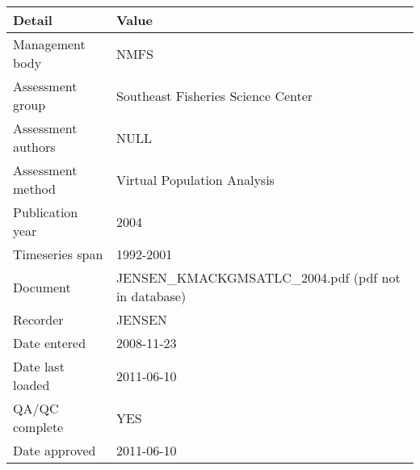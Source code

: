 \begin{table}[htb]
\centering
\begin{tabular}{lp{7cm}}
\toprule
Detail & Value \\
\midrule
Management body    & NMFS                                                 \\
Assessment group   & Southeast Fisheries Science Center                   \\
Assessment authors & NULL                                                 \\
Assessment method  & Virtual Population Analysis                          \\
Publication year   & 2004                                                 \\
Timeseries span    & 1992-2001                                            \\
Document           & JENSEN\_KMACKGMSATLC\_2004.pdf (pdf not in database) \\
Recorder           & JENSEN                                               \\
Date entered       & 2008-11-23                                           \\
Date last loaded   & 2011-06-10                                           \\
QA/QC complete     & YES                                                  \\
Date approved      & 2011-06-10                                           \\
\bottomrule
\end{tabular}
\label{tab:assessdet}
\end{table}
